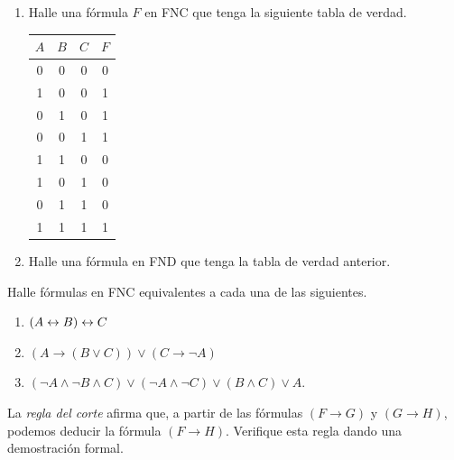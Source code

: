 \documentclass[12pt,a4paper]{book}
\begin{document}
    \begin{ejercicio}
        \begin{enumerate}[label=(\alph*)]
            \item Halle una fórmula $F$ en FNC que tenga la siguiente tabla de verdad.
            \begin{center}
            \renewcommand{\arraystretch}{1.4}
            \begin{tabular}{c | c | c | c}
                $A$ & $B$ & $C$ & $F$\\
                \hline
                0 & 0 & 0 & 0\\
                1 & 0 & 0 & 1\\
                0 & 1 & 0 & 1\\
                0 & 0 & 1 & 1\\
                1 & 1 & 0 & 0\\
                1 & 0 & 1 & 0\\
                0 & 1 & 1 & 0\\
                1 & 1 & 1 & 1\\
            \end{tabular}
            \end{center}
            \item Halle una fórmula en FND que tenga la tabla de verdad anterior.
        \end{enumerate}
    \end{ejercicio}

    \begin{ejercicio}
        Halle fórmulas en FNC equivalentes a cada una de las siguientes.
        \begin{enumerate}[label=(\alph*)]
            \item $(A\leftrightarrow B)\leftrightarrow C$
            \item $(A\rightarrow(B\vee C))\vee(C\rightarrow\neg A)$
            \item $(\neg A\wedge\neg B\wedge C)\vee(\neg A\wedge\neg C)\vee(B\wedge C)\vee A$.
        \end{enumerate}
    \end{ejercicio}

    \begin{ejercicio}
        La \textit{regla del corte} afirma que, a partir de las fórmulas $(F\rightarrow G)$ y $(G\rightarrow H)$, podemos
        deducir la fórmula $(F\rightarrow H)$. Verifique esta regla dando una demostración formal.
    \end{ejercicio}
\end{document}
